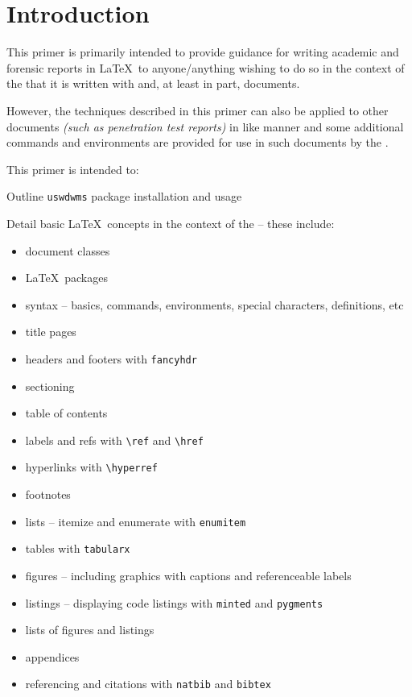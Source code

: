 \section{Introduction}
This primer is primarily intended to provide guidance for writing academic and forensic reports in \LaTeX\ to anyone/anything wishing to do so in the context of the \uswdwmspkg{} that it is written with and, at least in part, documents.

However, the techniques described in this primer can also be applied to other documents \textit{(such as penetration test reports)} in like manner and some additional commands and environments are provided for use in such documents by the \uswdwmspkg{}.

This primer is intended to:
\begin{methodology0}
  \item Outline \texttt{uswdwms} package installation and usage
  \item Detail basic \LaTeX\ concepts in the context of the \uswdwmspkg{} -- these include:
    \begin{itemize}
      \item document classes
      \item \LaTeX\ packages
      \item syntax -- basics, commands, environments, special characters, definitions, etc
      \item title pages
      \item headers and footers with \texttt{fancyhdr}
      \item sectioning
      \item table of contents
      \item labels and refs with \texttt{\textbackslash ref} and \texttt{\textbackslash href}
      \item hyperlinks with \texttt{\textbackslash hyperref}
      \item footnotes
      \item lists -- itemize and enumerate with \texttt{enumitem}
      \item tables with \texttt{tabularx}
      \item figures -- including graphics with captions and referenceable labels
      \item listings -- displaying code listings with \texttt{minted} and \texttt{pygments}
      \item lists of figures and listings
      \item appendices
      \item referencing and citations with \texttt{natbib} and \texttt{bibtex}

\end{itemize}
\end{methodology0}
